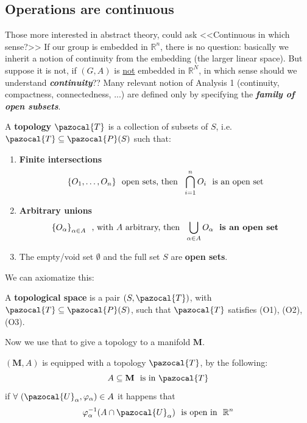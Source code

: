 \documentclass[../main.tex]{subfiles}
\begin{document}
\subsection[Operations are continuous]{Operations are continuous}
Those more interested in abstract theory, could ask <<Continuous in which sense?>> If our group is embedded in $\mathbb{R}^n$, there is no question: basically we inherit a notion of continuity from the embedding (the larger linear space). But suppose it is not, if $(G,A)$ is \underline{not} embedded in $\mathbb{R}^N$, in which sense should we understand \textbf{\textit{continuity}}?? Many relevant notion of Analysis 1 (continuity, compactness, connectedness, ...) are defined only by specifying the \textbf{\textit{family of open subsets}}.
\begin{definition}
A \textbf{topology} $\pazocal{T}$ is a collection of subsets of $S$, i.e. $\pazocal{T}\subseteq \pazocal{P}(S)$
such that: 
\begin{enumerate}\renewcommand{\labelenumi}{(O\arabic{enumi})}
    \item \textbf{Finite intersections}
    \[\Bqty{O_1,\dots,O_n} \ \textrm{ open sets, then } \ \bigcap_{i=1}^n O_i \ \textrm{ is an open set}\]
    \item \textbf{Arbitrary unions}
    \[\Bqty{O_\alpha}_{\alpha\in A} \ \textrm{ , with $A$ arbitrary, then } \ \bigcup_{\alpha\in A} O_\alpha \ \textrm{ \textbf{is an open set}}\]
    \item The empty/void set $\emptyset$ and the full set $S$ are \textbf{open sets}.
\end{enumerate}
\end{definition}
We can axiomatize this:
\begin{definition}
A \textbf{topological space} is a pair $(S,\pazocal{T})$, with $\pazocal{T}\subseteq \pazocal{P}(S)$, such that $\pazocal{T}$ satisfies (O1), (O2), (O3).
\end{definition}
Now we use that to give a topology to a manifold $\mathbf{M}$.
\begin{definition}
$(\mathbf{M}, A)$ is equipped with a topology $\pazocal{T}$, by the following:
\[
A \subseteq \mathbf{M} \ \textrm{ is in $\pazocal{T}$}
\]
if $\forall \ (\pazocal{U}_\alpha, \varphi_\alpha)\in A$ it happens that
\[
\varphi_\alpha^{-1}(A\cap \pazocal{U}_\alpha) \ \textrm{ is open in } \ \mathbb{R}^n
\]
\end{definition}
\end{document}
